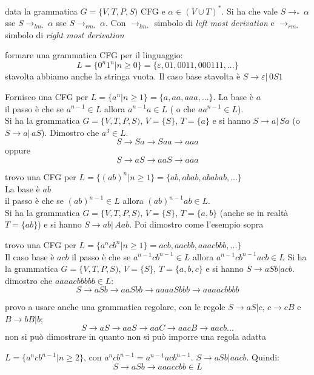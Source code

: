 \documentclass[a4paper,12pt, oneside]{book}
\begin{document}
\begin{teorema}
	data la grammatica $G=\{V,T,P,S)$ CFG e $\alpha\in (V\cup T)^*$. Si ha che vale $S\to_*\, \alpha$ sse $S\to_{lm_*}\, \alpha$ sse $S\to_{rm_*}\, \alpha$. Con $\to_{lm_*}$ simbolo di \textit{left most derivation }e $\to_{rm_*}$ simbolo di \textit{right most derivation}
\end{teorema}
\begin{esempio}
	formare una grammatica CFG per il linguaggio:
	$$L=\{0^n 1^n| n\geq 0\}=\{\varepsilon, 01, 0011, 000111,...\}$$
	stavolta abbiamo anche la stringa vuota. Il caso base stavolta è $S\to\varepsilon| \, 0S1$
\end{esempio}
\begin{esempio}
	Fornisco una CFG per $L=\{a^n|n\geq 1\}=\{a, aa, aaa,...\}$.
	La base è $a$ \\il passo è che se $a^{n-1}\in L$ allora $a^{n-1}a\in L$ ( o che $aa^{n-1}\in L$).\\
	Si ha la grammatica $G=\{V,T,P,S)$, $V=\{S\}$, $T=\{a\}$ e si hanno $S\to a|\,Sa$ (o  $S\to a|\,aS$). Dimostro che $a^3\in L$.
	$$S\to Sa \to Saa\to aaa$$
	oppure
	$$S\to aS\to aaS\to aaa$$
\end{esempio}
\begin{esempio}
	trovo una CFG per $L=\{(ab)^n|n\geq 1\}=\{ab, abab, ababab,...\}$\\
	La base è $ab$ \\il passo è che se $(ab)^{n-1}\in L$ allora $(ab)^{n-1}ab\in L$.\\
	Si ha la grammatica $G=\{V,T,P,S)$, $V=\{S\}$, $T=\{a,b\}$ (anche se in realtà $T=\{ab\}$) e si hanno $S\to ab|\,Aab$. Poi dimostro come l'esempio sopra
\end{esempio}
\begin{esempio}
	trovo una CFG per $L=\{a^n c b^n|n\geq 1\}=acb,aacbb,aaacbbb,...\}$\\
	Il caso base è $acb$ il passo è che se $a^{n-1}cb^{n-1}\in L$ allora $a^{n-1}cb^{n-1}acb\in L$
	Si ha la grammatica $G=\{V,T,P,S)$, $V=\{S\}$, $T=\{a,b,c\}$ e si hanno $S\to aSb|acb$.\\
	dimostro che $aaaacbbbbb\in L$:
	$$S\to aSb\to aaSbb\to aaaaSbbb\to aaaacbbbb$$

	provo a usare anche una grammatica regolare, con le regole $S\to aS|c$, $c\to cB$ e $B\to bB|b$;
	$$S\to aS\to aaS\to aaC\to aacB\to aacb...$$
	non si può dimostrare in quanto non si può imporre una regola adatta
\end{esempio}
\begin{esempio}
	$L=\{a^n c b^{n-1}|n\geq 2\}$, con $a^n c b^{n-1}=a^{n-1}acb^{n-1}$. $S\to aSb|aacb$. Quindi:
	$$S\to aSb\to aaaccbb\in L$$
\end{esempio}
\end{document}
